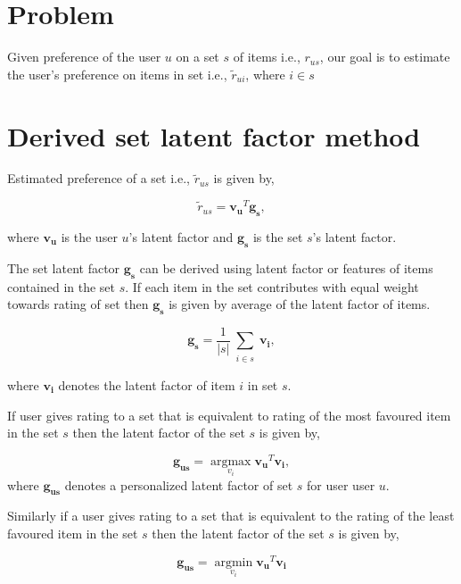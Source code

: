 \documentclass[11pt]{article}
\DeclareMathOperator*{\argmin}{argmin}
\DeclareMathOperator*{\argmax}{argmax}
\begin{document}
\section{Problem}

Given preference of the user $u$ on a set $s$ of items i.e., $r_{us}$,
our goal is to estimate the user's preference
on items in set i.e., $\tilde{r}_{ui}$, where $i \in s$

\section{Derived set latent factor method}
Estimated preference of a set i.e., $\tilde{r}_{us}$ is given by,

\begin{equation}
  \tilde{r}_{us} = \bm{v_u}^T \bm{g_s},
\end{equation}

where $\bm{v_u}$ is the user $u$'s latent factor and $\bm{g_s}$ is the set $s$'s latent
factor. 

The set latent factor $\bm{g_s}$ can be derived using latent factor or features
of items contained in the set $s$. If each item in the set contributes with
equal weight towards rating of set
then $\bm{g_s}$ is given by average of the latent factor of items.

\begin{equation}
  \bm{g_s} = \frac{1}{|s|}\sum_{\substack{i \in s}}\bm{v_i},
\end{equation}

where $\bm{v_i}$ denotes the latent factor of item $i$ in set $s$.

If user gives rating to a set that is equivalent to rating of the most favoured item
in the set $s$ then the latent factor of the set $s$ is given by,

\begin{equation}
  \bm{g_{us}} = \argmax\limits_{v_i} \bm{v_u}^T \bm{v_i}, 
\end{equation}
where $\bm{g_{us}}$ denotes a personalized latent factor of set $s$ for user
user $u$.

Similarly if a user gives rating to a set that is equivalent to the rating of
the least favoured item in the set $s$ then the latent factor of the set $s$ is
given by,

\begin{equation}
  \bm{g_{us}} = \argmin\limits_{v_i} \bm{v_u}^T \bm{v_i}
\end{equation}
\end{document}
